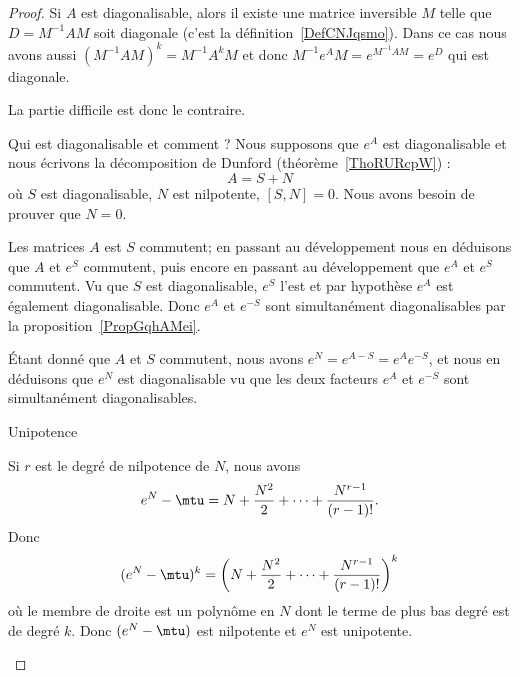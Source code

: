 \begin{proof}
	Si \( A\) est diagonalisable, alors il existe une matrice inversible \( M\) telle que \( D=M^{-1}AM\) soit diagonale (c'est la définition~\ref{DefCNJqsmo}). Dans ce cas nous avons aussi \( (M^{-1}AM)^k=M^{-1}A^kM\) et donc \( M^{-1}e^AM=e^{M^{-1}AM}=e^D\) qui est diagonale.

	La partie difficile est donc le contraire.

	\begin{subproof}
		\item[Qui est diagonalisable et comment ?]
		Nous supposons que \( e^A\) est diagonalisable et nous écrivons la décomposition de Dunford (théorème~\ref{ThoRURcpW}) :
		\begin{equation}
			A=S+N
		\end{equation}
		où \( S\) est diagonalisable, \( N\) est nilpotente, \( [S,N]=0\). Nous avons besoin de prouver que \( N=0\).

		Les matrices \( A\) est \( S\) commutent; en passant au développement nous en déduisons que \( A\) et \( e^S\) commutent, puis encore en passant au développement que \( e^A\) et \( e^S\) commutent. Vu que \( S\) est diagonalisable, \( e^S\) l'est et par hypothèse \( e^A\) est également diagonalisable. Donc \( e^A\) et \( e^{-S}\) sont simultanément diagonalisables par la proposition~\ref{PropGqhAMei}.

		Étant donné que \( A\) et \( S\) commutent, nous avons \( e^N=e^{A-S}=e^Ae^{-S}\), et nous en déduisons que \( e^N\) est diagonalisable vu que les deux facteurs \( e^A\) et \( e^{-S}\) sont simultanément diagonalisables.

		\item[Unipotence]

		Si \( r\) est le degré de nilpotence de \( N\), nous avons
		\begin{equation}    \label{EqQHjvLZQ}
			e^N-\mtu=N+\frac{ N^2 }{2}+\cdots +\frac{ N^{r-1} }{ (r-1)! }.
		\end{equation}
		Donc
		\begin{equation}
			(e^N-\mtu)^k=\left( N+\frac{ N^2 }{2}+\cdots +\frac{ N^{r-1} }{ (r-1)! } \right)^k
		\end{equation}
		où le membre de droite est un polynôme en \( N\) dont le terme de plus bas degré est de degré \( k\). Donc \( (e^N-\mtu)\) est nilpotente et \( e^N\) est unipotente.


\end{subproof}
\end{proof}

